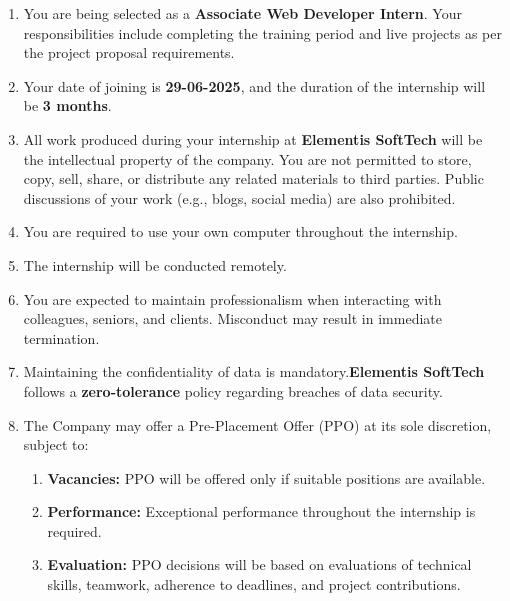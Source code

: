 \documentclass[a4paper,12pt]{article}
\begin{document}
\vspace{0.5cm}
\begin{enumerate}[wide, label=\arabic*., labelindent=0pt]

    \item You are being selected as a \textbf{Associate Web Developer Intern}. Your responsibilities include completing the training period and live projects as per the project proposal requirements.

    \item Your date of joining is \textbf{29-06-2025}, and the duration of the internship will be \textbf{3 months}.

    \item All work produced during your internship at \textbf{Elementis SoftTech} will be the intellectual property of the company. You are not permitted to store, copy, sell, share, or distribute any related materials to third parties. Public discussions of your work (e.g., blogs, social media) are also prohibited.

    \item You are required to use your own computer throughout the internship.

    \item The internship will be conducted remotely.

    \item You are expected to maintain professionalism when interacting with colleagues, seniors, and clients. Misconduct may result in immediate termination.

    \item Maintaining the confidentiality of data is mandatory.\textbf{Elementis SoftTech} follows a \textbf{zero-tolerance} policy regarding breaches of data security.

    \item The Company may offer a Pre-Placement Offer (PPO) at its sole discretion, subject to:
    \begin{enumerate}[label=\alph*.]
        \item \textbf{Vacancies:} PPO will be offered only if suitable positions are available.
        \item \textbf{Performance:} Exceptional performance throughout the internship is required.
        \item \textbf{Evaluation:} PPO decisions will be based on evaluations of technical skills, teamwork, adherence to deadlines, and project contributions.
    \end{enumerate}

\end{enumerate}
\end{document}

